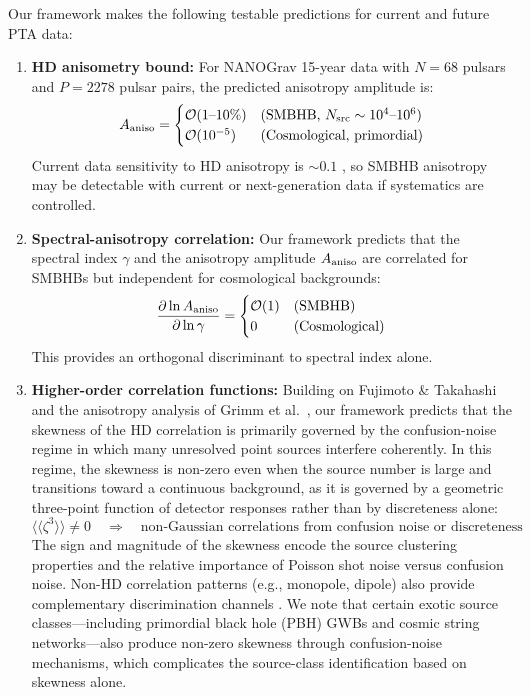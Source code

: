 \documentclass[11pt,a4paper]{article}
\begin{document}
Our framework makes the following testable predictions for current and future PTA data:

\begin{enumerate}
\item \textbf{HD anisometry bound:} For NANOGrav 15-year data with $N = 68$ pulsars and $P = 2278$ pulsar pairs, the predicted anisotropy amplitude is:
\begin{equation}
A_{\rm aniso} = \begin{cases}
\mathcal{O}(1\text{--}10\%) & \text{(SMBHB, $N_{\rm src} \sim 10^4\text{--}10^6$)}\\
\mathcal{O}(10^{-5}) & \text{(Cosmological, primordial)}
\end{cases}
\end{equation}
Current data sensitivity to HD anisotropy is $\sim 0.1$ \cite{Lemke:2024}, so SMBHB anisotropy may be detectable with current or next-generation data if systematics are controlled.

\item \textbf{Spectral-anisotropy correlation:} Our framework predicts that the spectral index $\gamma$ and the anisotropy amplitude $A_{\rm aniso}$ are correlated for SMBHBs but independent for cosmological backgrounds:
\begin{equation}
\frac{\partial \ln A_{\rm aniso}}{\partial \ln \gamma} = \begin{cases}
\mathcal{O}(1) & \text{(SMBHB)}\\
0 & \text{(Cosmological)}
\end{cases}
\end{equation}
This provides an orthogonal discriminant to spectral index alone.

\item \textbf{Higher-order correlation functions:} Building on Fujimoto \& Takahashi \cite{Fujimoto:2026} and the anisotropy analysis of Grimm et al.\ \cite{Grimm:2025}, our framework predicts that the skewness of the HD correlation is primarily governed by the confusion-noise regime in which many unresolved point sources interfere coherently. In this regime, the skewness is non-zero even when the source number is large and transitions toward a continuous background, as it is governed by a geometric three-point function of detector responses rather than by discreteness alone:
\begin{equation}
\langle\langle \zeta^3 \rangle\rangle \neq 0 \quad \Rightarrow \quad \text{non-Gaussian correlations from confusion noise or discreteness}
\end{equation}
The sign and magnitude of the skewness encode the source clustering properties and the relative importance of Poisson shot noise versus confusion noise. Non-HD correlation patterns (e.g., monopole, dipole) also provide complementary discrimination channels \cite{SatoPolito:2023,Grimm:2025}. We note that certain exotic source classes---including primordial black hole (PBH) GWBs and cosmic string networks---also produce non-zero skewness through confusion-noise mechanisms, which complicates the source-class identification based on skewness alone.
\end{enumerate}
\end{document}
